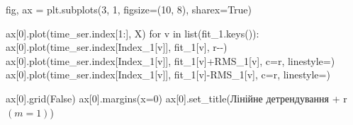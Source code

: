 \documentclass[
  letterpaper,
]{report}
\newenvironment{Shaded}{\begin{snugshade}}{\end{snugshade}}
\newcommand{\BuiltInTok}[1]{\textcolor[rgb]{0.00,0.23,0.31}{#1}}
\newcommand{\ControlFlowTok}[1]{\textcolor[rgb]{0.00,0.23,0.31}{#1}}
\newcommand{\DecValTok}[1]{\textcolor[rgb]{0.68,0.00,0.00}{#1}}
\newcommand{\KeywordTok}[1]{\textcolor[rgb]{0.00,0.23,0.31}{#1}}
\newcommand{\NormalTok}[1]{\textcolor[rgb]{0.00,0.23,0.31}{#1}}
\newcommand{\OperatorTok}[1]{\textcolor[rgb]{0.37,0.37,0.37}{#1}}
\newcommand{\StringTok}[1]{\textcolor[rgb]{0.13,0.47,0.30}{#1}}
\newcommand{\VariableTok}[1]{\textcolor[rgb]{0.07,0.07,0.07}{#1}}
\newcommand{\VerbatimStringTok}[1]{\textcolor[rgb]{0.13,0.47,0.30}{#1}}
\begin{document}
\begin{Shaded}
\begin{Highlighting}[]
\NormalTok{fig, ax }\OperatorTok{=}\NormalTok{ plt.subplots(}\DecValTok{3}\NormalTok{, }\DecValTok{1}\NormalTok{, figsize}\OperatorTok{=}\NormalTok{(}\DecValTok{10}\NormalTok{, }\DecValTok{8}\NormalTok{), sharex}\OperatorTok{=}\VariableTok{True}\NormalTok{)}


\NormalTok{ax[}\DecValTok{0}\NormalTok{].plot(time\_ser.index[}\DecValTok{1}\NormalTok{:], X)}
\ControlFlowTok{for}\NormalTok{ v }\KeywordTok{in} \BuiltInTok{list}\NormalTok{(fit\_1.keys()):}
\NormalTok{    ax[}\DecValTok{0}\NormalTok{].plot(time\_ser.index[Index\_1[v]], fit\_1[v], }\StringTok{\textquotesingle{}r{-}{-}\textquotesingle{}}\NormalTok{)}
\NormalTok{    ax[}\DecValTok{0}\NormalTok{].plot(time\_ser.index[Index\_1[v]], fit\_1[v]}\OperatorTok{+}\NormalTok{RMS\_1[v], c}\OperatorTok{=}\StringTok{\textquotesingle{}r\textquotesingle{}}\NormalTok{, linestyle}\OperatorTok{=}\StringTok{\textquotesingle{}{-}\textquotesingle{}}\NormalTok{)}
\NormalTok{    ax[}\DecValTok{0}\NormalTok{].plot(time\_ser.index[Index\_1[v]], fit\_1[v]}\OperatorTok{{-}}\NormalTok{RMS\_1[v], c}\OperatorTok{=}\StringTok{\textquotesingle{}r\textquotesingle{}}\NormalTok{, linestyle}\OperatorTok{=}\StringTok{\textquotesingle{}{-}\textquotesingle{}}\NormalTok{)}

\NormalTok{ax[}\DecValTok{0}\NormalTok{].grid(}\VariableTok{False}\NormalTok{)}
\NormalTok{ax[}\DecValTok{0}\NormalTok{].margins(x}\OperatorTok{=}\DecValTok{0}\NormalTok{)}
\NormalTok{ax[}\DecValTok{0}\NormalTok{].set\_title(}\StringTok{\textquotesingle{}Лінійне детрендування \textquotesingle{}} \OperatorTok{+} \VerbatimStringTok{r\textquotesingle{}$(m=1)$\textquotesingle{}}\NormalTok{)}




\end{Highlighting}
\end{Shaded}
\end{document}

